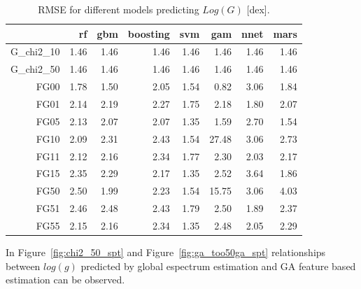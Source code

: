 \begin{table}[ht]
\centering
\begin{tabular}{rrrrrrrr}
  \hline
 & rf & gbm & boosting & svm & gam & nnet & mars \\ 
  \hline
G\_chi2\_10 & 1.46 & 1.46 & 1.46 & 1.46 & 1.46 & 1.46 & 1.46 \\ 
  G\_chi2\_50 & 1.46 & 1.46 & 1.46 & 1.46 & 1.46 & 1.46 & 1.46 \\ 
  FG00 & 1.78 & 1.50 & 2.05 & 1.54 & 0.82 & 3.06 & 1.84 \\ 
  FG01 & 2.14 & 2.19 & 2.27 & 1.75 & 2.18 & 1.80 & 2.07 \\ 
  FG05 & 2.13 & 2.07 & 2.07 & 1.35 & 1.59 & 2.70 & 1.54 \\ 
  FG10 & 2.09 & 2.31 & 2.43 & 1.54 & 27.48 & 3.06 & 2.73 \\ 
  FG11 & 2.12 & 2.16 & 2.34 & 1.77 & 2.30 & 2.03 & 2.17 \\ 
  FG15 & 2.35 & 2.29 & 2.17 & 1.35 & 2.52 & 3.64 & 1.86 \\ 
  FG50 & 2.50 & 1.99 & 2.23 & 1.54 & 15.75 & 3.06 & 4.03 \\ 
  FG51 & 2.46 & 2.48 & 2.43 & 1.79 & 2.50 & 1.89 & 2.37 \\ 
  FG55 & 2.15 & 2.16 & 2.34 & 1.35 & 2.48 & 2.05 & 2.29 \\ 
   \hline
\end{tabular}
\caption { RMSE for different models predicting $Log(G)$ [dex].} 
\label{tab:models_G_mae} 
\end{table}


In Figure~\ref{fig:chi2_50_spt} and Figure~\ref{fig:ga_too50ga_spt} 
relationships between $log(g)$ predicted by global espectrum estimation 
and GA feature based estimation can be observed.

